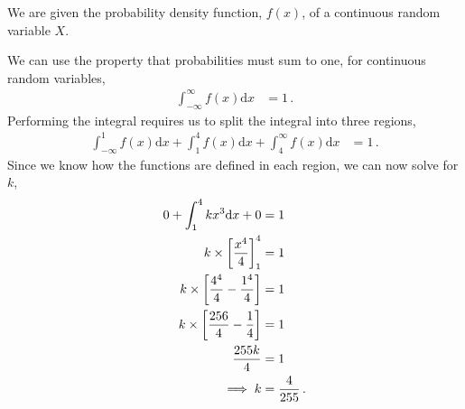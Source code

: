%
%


\begin{subquestions}

\subquestion
	
We are given the probability density function, $f(x)$, of a continuous random variable $X$.

We can use the property that probabilities must sum to one,  for continuous random variables,
\begin{align}
	\int_{-\infty}^{\infty} f(x)\mathrm{d}x & = 1 \,. 
\end{align}
Performing the integral requires us to split the integral into three regions,
\begin{align}
	\int_{-\infty}^{1} f(x)\mathrm{d}x + \int_{1}^{4} f(x)\mathrm{d}x + \int_{4}^{\infty} f(x)\mathrm{d}x & = 1 \,. 
\end{align}
Since we know how the functions are defined in each region, we can now solve for $k$,
\begin{align}
	0 + \int_{1}^{4} kx^3\mathrm{d}x + 0  & = 1 \nonumber \\
	k \times \left[\frac{x^4}{4}\right]^4_1 & = 1 \nonumber \\
	k \times \left[\frac{4^4}{4} - \frac{1^4}{4} \right] & = 1 \nonumber \\
	k \times \left[\frac{256}{4} - \frac{1}{4} \right] & = 1 \nonumber \\
	\frac{255k}{4} & = 1 \nonumber \\
	\implies k & = \frac{4}{255} \,.
\end{align}


\subquestion


\end{subquestions}
